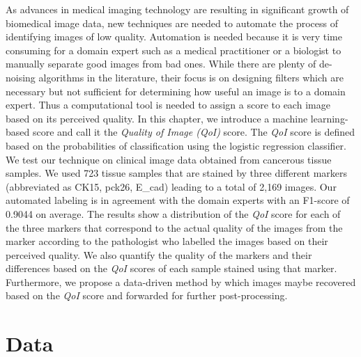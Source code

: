 As advances in medical imaging technology are resulting in significant growth of biomedical image data, new techniques are needed to automate the process of identifying images of low quality. Automation is needed because it is very time consuming for a domain expert such as a medical practitioner or a biologist to manually separate good images from bad ones. While there are plenty of de-noising algorithms in the literature, their focus is on designing filters which are necessary but not sufficient for determining how useful an image is to a domain expert.
Thus a computational tool is needed to assign a score to each image based on its perceived quality. In this chapter, we introduce a machine learning-based score and call it the \textit{Quality of Image (QoI)} score. The \textit{QoI} score is defined based on the probabilities of classification using the logistic regression classifier.
We test our technique on clinical image data obtained from cancerous tissue samples. We used 723 tissue samples that are stained by three different markers (abbreviated as CK15, pck26, E\_cad) leading to a total of 2,169 images. Our automated labeling is in agreement with the domain experts with an F1-score of 0.9044 on average. The results show a distribution of the \textit{QoI} score for each of the three markers that correspond to the actual quality of the images from the marker according to the pathologist who labelled the images based on their perceived quality.  We also quantify the quality of the markers and their differences based on the \textit{QoI} scores of each sample stained using that marker. 
Furthermore, we propose a data-driven method by which images maybe recovered based on the \textit{QoI} score and forwarded for further post-processing.

\section{Data}

